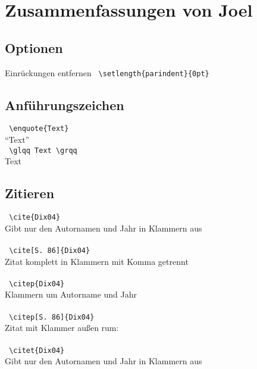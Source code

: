 \chapter{Zusammenfassungen von Joel}
\label{cha:joel}

\section{Optionen} \label{sec:options}
    Einrückungen entfernen
    \texttt{ \textbackslash setlength\{parindent\}\{0pt\} } 
    \setlength{parindent}{0pt}

\section{Anführungszeichen} \label{sec:marks}    
    \texttt{ \textbackslash enquote\{Text\} } \\
    \enquote{Text} \\
    
    \texttt{ \textbackslash glqq Text \textbackslash grqq } \\
    \glqq Text \grqq \\

\section{Zitieren} \label{sec:quotes}
    \texttt{ \textbackslash cite\{Dix04\} } \\
    Gibt nur den Autornamen und Jahr in Klammern aus \\
    \cite{Dix04} \\

    \texttt{ \textbackslash cite[S. 86]\{Dix04\} } \\
    Zitat komplett in Klammern mit Komma getrennt \\
    \cite[S. 86]{Dix04} \\
    
    \texttt{ \textbackslash citep\{Dix04\} } \\
    Klammern um Autorname und Jahr \\
    \citep{Dix04} \\

    \texttt{ \textbackslash citep[S. 86]\{Dix04\} } \\
    Zitat mit Klammer außen rum: \\
    \citep[S. 86]{Dix04} \\
 
    \texttt{ \textbackslash citet\{Dix04\} } \\
    Gibt nur den Autornamen und Jahr in Klammern aus \\
    \citet{Dix04} \\

